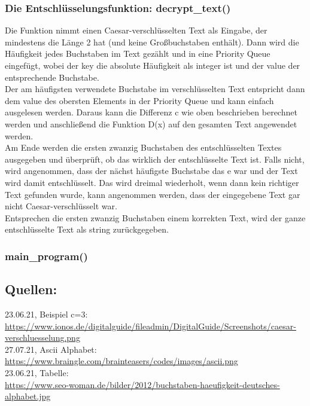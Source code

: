 \documentclass[ngerman,12pt]{article}
\begin{document}
\subsubsection*{Die Entschlüsselungsfunktion: decrypt\_text()}

Die Funktion nimmt einen Caesar-verschlüsselten Text als Eingabe, der mindestens die Länge 2 hat (und keine Großbuchstaben enthält). Dann wird die Häufigkeit jedes Buchstaben im Text gezählt und in eine Priority Queue eingefügt, wobei der key die absolute Häufigkeit als integer ist und der value der entsprechende Buchstabe.\\
Der am häufigsten verwendete Buchstabe im verschlüsselten Text entspricht dann dem value des obersten Elements in der Priority Queue und kann einfach ausgelesen werden. Daraus kann die Differenz c wie oben beschrieben berechnet werden und anschließend die Funktion D(x) auf den gesamten Text angewendet werden.\\
Am Ende werden die ersten zwanzig Buchstaben des entschlüsselten Textes ausgegeben und überprüft, ob das wirklich der entschlüsselte Text ist.
Falls nicht, wird angenommen, dass der nächst häufigste Buchstabe das e war und der Text wird damit entschlüsselt. Das wird dreimal wiederholt, wenn dann kein richtiger Text gefunden wurde, kann angenommen werden, dass der eingegebene Text gar nicht Caesar-verschlüsselt war.\\
Entsprechen die ersten zwanzig Buchstaben einem korrekten Text, wird der ganze entschlüsselte Text als string zurückgegeben.


\subsubsection*{main\_program()}


\newpage
\subsection*{Quellen:}

23.06.21, Beispiel c=3: \\
\url{https://www.ionos.de/digitalguide/fileadmin/DigitalGuide/Screenshots/caesar-verschluesselung.png}\\
27.07.21, Ascii Alphabet: \\
\url{https://www.braingle.com/brainteasers/codes/images/ascii.png}\\
23.06.21, Tabelle: \\
\url{https://www.seo-woman.de/bilder/2012/buchstaben-haeufigkeit-deutsches-alphabet.jpg}\\
 
\end{document}
